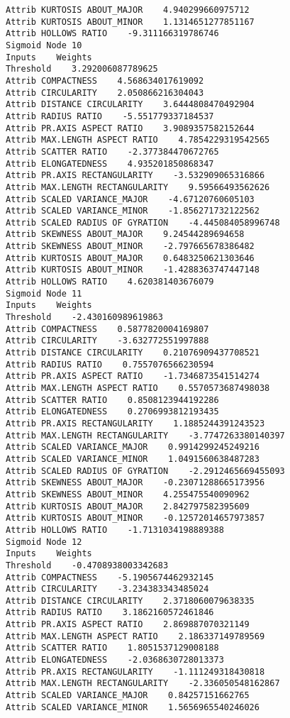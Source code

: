 \documentclass[
	article,			%
	11pt,				%
	oneside,			%
	a4paper,			%
	english,			%
	brazil,				%
	sumario=tradicional
	]{abntex2}
\begin{document}
\begin{lstlisting}
Attrib KURTOSIS ABOUT_MAJOR    4.940299660975712
Attrib KURTOSIS ABOUT_MINOR    1.1314651277851167
Attrib HOLLOWS RATIO    -9.311166319786746
Sigmoid Node 10
Inputs    Weights
Threshold    3.292006087789625
Attrib COMPACTNESS    4.568634017619092
Attrib CIRCULARITY    2.050866216304043
Attrib DISTANCE CIRCULARITY    3.6444808470492904
Attrib RADIUS RATIO    -5.551779337184537
Attrib PR.AXIS ASPECT RATIO    3.9089357582152644
Attrib MAX.LENGTH ASPECT RATIO    4.7854229319542565
Attrib SCATTER RATIO    -2.377384470672765
Attrib ELONGATEDNESS    4.935201850868347
Attrib PR.AXIS RECTANGULARITY    -3.532909065316866
Attrib MAX.LENGTH RECTANGULARITY    9.59566493562626
Attrib SCALED VARIANCE_MAJOR    -4.67120760605103
Attrib SCALED VARIANCE_MINOR    -1.856271732122562
Attrib SCALED RADIUS OF GYRATION    -4.445084058996748
Attrib SKEWNESS ABOUT_MAJOR    9.24544289694658
Attrib SKEWNESS ABOUT_MINOR    -2.797665678386482
Attrib KURTOSIS ABOUT_MAJOR    0.6483250621303646
Attrib KURTOSIS ABOUT_MINOR    -1.4288363747447148
Attrib HOLLOWS RATIO    4.620381403676079
Sigmoid Node 11
Inputs    Weights
Threshold    -2.430160989619863
Attrib COMPACTNESS    0.5877820004169807
Attrib CIRCULARITY    -3.632772551997888
Attrib DISTANCE CIRCULARITY    0.21076909437708521
Attrib RADIUS RATIO    0.7557076566230594
Attrib PR.AXIS ASPECT RATIO    -1.7346873541514274
Attrib MAX.LENGTH ASPECT RATIO    0.5570573687498038
Attrib SCATTER RATIO    0.8508123944192286
Attrib ELONGATEDNESS    0.2706993812193435
Attrib PR.AXIS RECTANGULARITY    1.1885244391243523
Attrib MAX.LENGTH RECTANGULARITY    -3.7747263380140397
Attrib SCALED VARIANCE_MAJOR    0.9914299245249216
Attrib SCALED VARIANCE_MINOR    1.0491560638487283
Attrib SCALED RADIUS OF GYRATION    -2.2912465669455093
Attrib SKEWNESS ABOUT_MAJOR    -0.23071288665173956
Attrib SKEWNESS ABOUT_MINOR    4.255475540090962
Attrib KURTOSIS ABOUT_MAJOR    2.842797582395609
Attrib KURTOSIS ABOUT_MINOR    -0.12572014657973857
Attrib HOLLOWS RATIO    -1.7131034198889388
Sigmoid Node 12
Inputs    Weights
Threshold    -0.4708938003342683
Attrib COMPACTNESS    -5.1905674462932145
Attrib CIRCULARITY    -3.234383343485024
Attrib DISTANCE CIRCULARITY    2.3718060079638335
Attrib RADIUS RATIO    3.1862160572461846
Attrib PR.AXIS ASPECT RATIO    2.869887070321149
Attrib MAX.LENGTH ASPECT RATIO    2.186337149789569
Attrib SCATTER RATIO    1.8051537129008188
Attrib ELONGATEDNESS    -2.0368630728013373
Attrib PR.AXIS RECTANGULARITY    -1.111249318430818
Attrib MAX.LENGTH RECTANGULARITY    -2.336050548162867
Attrib SCALED VARIANCE_MAJOR    0.84257151662765
Attrib SCALED VARIANCE_MINOR    1.5656965540246026

\end{lstlisting}
\end{document}
